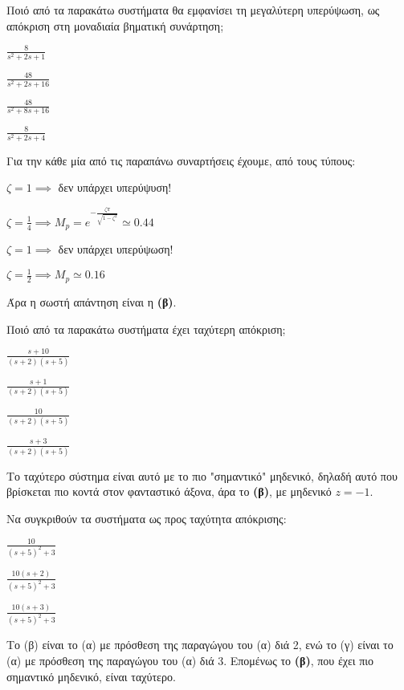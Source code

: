 \documentclass[11pt,a4paper,notitlepage,fleqn,final]{article}
\begin{document}
\begin{exercise}
Ποιό από τα παρακάτω συστήματα θα εμφανίσει τη μεγαλύτερη υπερύψωση, ως απόκριση στη μοναδιαία
βηματική συνάρτηση;
\begin{enumgreekparen}
	\item \( \displaystyle \frac{8}{s^2+2s+1} \)
	\item \( \displaystyle \frac{48}{s^2+2s+16} \)
	\item \( \displaystyle \frac{48}{s^2+8s+16} \)
	\item \( \displaystyle \frac{8}{s^2+2s+4} \)
\end{enumgreekparen}
\tcblower

Για την κάθε μία από τις παραπάνω συναρτήσεις έχουμε, από τους τύπους:
\begin{enumgreekparen}
	\item \( ζ = 1 \implies  \) δεν υπάρχει υπερύψυση!
	\item \( ζ = \frac{1}{4} \implies M_p = e^{-\frac{ζπ}{\sqrt{1-ζ^2}}} \simeq 0.44 \)
	\item \( ζ = 1 \implies \) δεν υπάρχει υπερύψωση!
	\item \( ζ = \frac{1}{2} \implies M_p \simeq 0.16 \)
\end{enumgreekparen}

Άρα η σωστή απάντηση είναι η \textbf{(β)}.
\end{exercise}


\begin{exercise}
Ποιό από τα παρακάτω συστήματα έχει ταχύτερη απόκριση;
\begin{enumgreekparen}
	\item \( \displaystyle \frac{s+10}{(s+2)(s+5)} \)
	\item \( \displaystyle \frac{s+1}{(s+2)(s+5)} \)
	\item \( \displaystyle \frac{10}{(s+2)(s+5)} \)
	\item \( \displaystyle \frac{s+3}{(s+2)(s+5)} \)
\end{enumgreekparen}

\tcblower

Το ταχύτερο σύστημα είναι αυτό με το πιο "σημαντικό" μηδενικό, δηλαδή αυτό που βρίσκεται πιο
κοντά στον φανταστικό άξονα, άρα το \textbf{(β)}, με μηδενικό \( z = -1 \).

\end{exercise}


\begin{exercise}
Να συγκριθούν τα συστήματα ως προς ταχύτητα απόκρισης:
\begin{enumgreekparen}
	\item \( \displaystyle \frac{10}{(s+5)^2+3} \)
	\item \( \displaystyle \frac{10(s+2)}{(s+5)^2+3} \)
	\item \( \displaystyle \frac{10(s+3)}{(s+5)^2+3} \)
\end{enumgreekparen}
\tcblower

Το (β) είναι το (α) με πρόσθεση της παραγώγου του (α) διά 2, ενώ το (γ) είναι το (α) με
πρόσθεση της παραγώγου του (α) διά 3. Επομένως το \textbf{(β)}, που έχει πιο σημαντικό
μηδενικό, είναι ταχύτερο.
\end{exercise}
\end{document}
